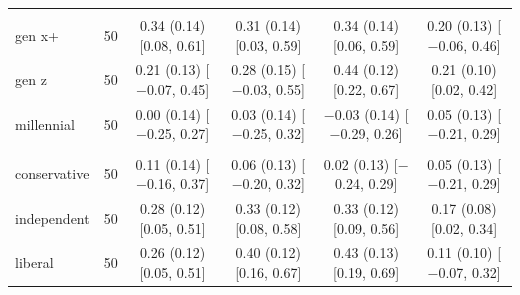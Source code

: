 \begin{table}[t]
\begin{tabular}{@{}lr*{4}{c}@{}}
\addlinespace
\multicolumn{6}{@{}l}{\textit{Age (D)}} \\
\quad gen x+ & 50 & \makecell{0.34 (0.14)\\ {[}0.08, 0.61{]}} & \makecell{0.31 (0.14)\\ {[}0.03, 0.59{]}} & \makecell{0.34 (0.14)\\ {[}0.06, 0.59{]}} & \makecell{0.20 (0.13)\\ {[}$-$0.06, 0.46{]}} \\
\quad gen z & 50 & \makecell{0.21 (0.13)\\ {[}$-$0.07, 0.45{]}} & \makecell{0.28 (0.15)\\ {[}$-$0.03, 0.55{]}} & \makecell{0.44 (0.12)\\ {[}0.22, 0.67{]}} & \makecell{0.21 (0.10)\\ {[}0.02, 0.42{]}} \\
\quad millennial & 50 & \makecell{0.00 (0.14)\\ {[}$-$0.25, 0.27{]}} & \makecell{0.03 (0.14)\\ {[}$-$0.25, 0.32{]}} & \makecell{$-$0.03 (0.14)\\ {[}$-$0.29, 0.26{]}} & \makecell{0.05 (0.13)\\ {[}$-$0.21, 0.29{]}} \\
\addlinespace
\multicolumn{6}{@{}l}{\textit{Politics (N)}} \\
\quad conservative & 50 & \makecell{0.11 (0.14)\\ {[}$-$0.16, 0.37{]}} & \makecell{0.06 (0.13)\\ {[}$-$0.20, 0.32{]}} & \makecell{0.02 (0.13)\\ {[}$-$0.24, 0.29{]}} & \makecell{0.05 (0.13)\\ {[}$-$0.21, 0.29{]}} \\
\quad independent & 50 & \makecell{0.28 (0.12)\\ {[}0.05, 0.51{]}} & \makecell{0.33 (0.12)\\ {[}0.08, 0.58{]}} & \makecell{0.33 (0.12)\\ {[}0.09, 0.56{]}} & \makecell{0.17 (0.08)\\ {[}0.02, 0.34{]}} \\
\quad liberal & 50 & \makecell{0.26 (0.12)\\ {[}0.05, 0.51{]}} & \makecell{0.40 (0.12)\\ {[}0.16, 0.67{]}} & \makecell{0.43 (0.13)\\ {[}0.19, 0.69{]}} & \makecell{0.11 (0.10)\\ {[}$-$0.07, 0.32{]}} \\

\end{tabular}
\end{table}
